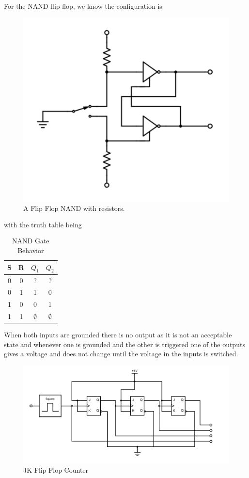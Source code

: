 \documentclass[11pt,letterpaper,onecolumn]{article}
\begin{document}
 For the NAND flip flop, we know the configuration is
 
 \begin{figure}[H]
    \centering
    \includegraphics[scale = .5]{cross1.pdf}
    \caption{A Flip Flop NAND with resistors.}
    \label{fig:data2}
\end{figure} 

with the truth table being

 \begin{table}[H]
\centering
\begin{tabular}{|c|c|c|c|}
 \hline
 S & R & $Q_1$ & $Q_2$ \\\hline
 0 & 0 & ? & ?\\
 0 & 1 & 1 & 0 \\
 1 & 0 & 0 & 1 \\
 1 & 1 & $\emptyset$ & $\emptyset$ \\
  \hline
\end{tabular}
\caption{NAND Gate Behavior}
\label{tab:NAND1}
\end{table}
 
 When both inputs are grounded there is no output as it is not an acceptable state and whenever one is grounded and the other is triggered one of the outputs gives a voltage and does not change until the voltage in the inputs is switched. 
 
\begin{figure}[H]
    \centering
    \includegraphics[scale = .6]{flipflop.pdf}
    \caption{JK Flip-Flop Counter}
    \label{fig:my_label}
\end{figure}
\end{document}
